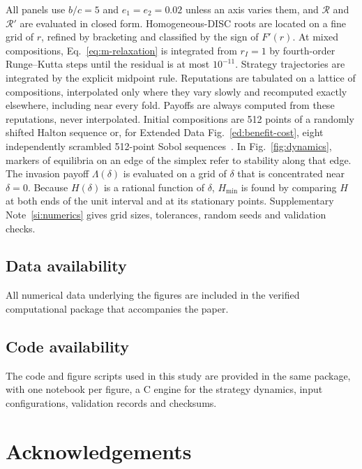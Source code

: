 \documentclass[10pt]{wlscirep}
\newif\ifdraftnotes
\DeclareRobustCommand{\draftnote}[1]{%
  \ifdraftnotes{\color{red!60!black}\sffamily\footnotesize[#1]}\fi}
\newcommand{\Rmap}{\mathscr{R}}            %
\newcommand{\Hmin}{H_{\min}}
\theoremstyle{plain}
\theoremstyle{remark}
\begin{document}
All panels use $b/c=5$ and $e_1=e_2=0.02$ unless an axis varies them, and $\Rmap$ and $\Rmap'$ are evaluated in closed form. Homogeneous-DISC roots are located on a fine grid of $r$, refined by bracketing and classified by the sign of $F'(r)$. At mixed compositions, Eq.~\eqref{eq:m-relaxation} is integrated from $r_I=1$ by fourth-order Runge--Kutta steps until the residual is at most $10^{-11}$. Strategy trajectories are integrated by the explicit midpoint rule. Reputations are tabulated on a lattice of compositions, interpolated only where they vary slowly and recomputed exactly elsewhere, including near every fold. Payoffs are always computed from these reputations, never interpolated. Initial compositions are 512 points of a randomly shifted Halton sequence or, for Extended Data Fig.~\ref{ed:benefit-cost}, eight independently scrambled 512-point Sobol sequences~\cite{virtanen2020}. In Fig.~\ref{fig:dynamics}, markers of equilibria on an edge of the simplex refer to stability along that edge. The invasion payoff $\Lambda(\delta)$ is evaluated on a grid of $\delta$ that is concentrated near $\delta=0$. Because $H(\delta)$ is a rational function of $\delta$, $\Hmin$ is found by comparing $H$ at both ends of the unit interval and at its stationary points. Supplementary Note~\ref{si:numerics} gives grid sizes, tolerances, random seeds and validation checks.

\subsection*{Data availability}
All numerical data underlying the figures are included in the verified computational package that accompanies the paper. \draftnote{Repository and DOI to be added before submission.}

\subsection*{Code availability}
The code and figure scripts used in this study are provided in the same package, with one notebook per figure, a C engine for the strategy dynamics, input configurations, validation records and checksums. \draftnote{Repository and DOI to be added before submission.}



\section*{Acknowledgements}
\draftnote{To be added.}
\end{document}
